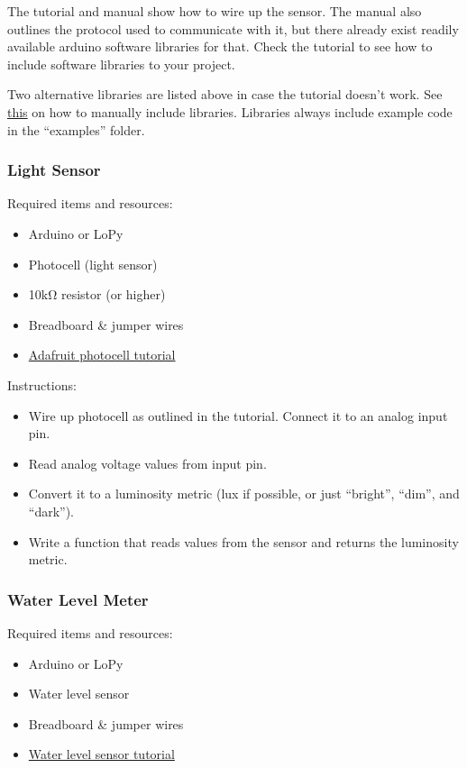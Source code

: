 \documentclass[a4paper]{article}
\begin{document}
The tutorial and manual show how to wire up the sensor.
The manual also outlines the protocol used to communicate with it,
but there already exist readily available arduino software libraries for that.
Check the tutorial to see how to include software libraries to your project.

Two alternative libraries are listed above in case the tutorial doesn't work.
See \href{https://www.arduino.cc/en/Guide/Libraries#toc5}{this} on how to manually include libraries.
Libraries always include example code in the ``examples'' folder.


\subsubsection{Light Sensor}

Required items and resources:
\begin{itemize}
 \item Arduino or LoPy
 \item Photocell (light sensor)
 \item 10k\si{\ohm} resistor (or higher)
 \item Breadboard \& jumper wires
 \item \href{https://learn.adafruit.com/photocells/using-a-photocell}{Adafruit photocell tutorial}
\end{itemize}

Instructions:
\begin{itemize}
 \item Wire up photocell as outlined in the tutorial. Connect it to an analog input pin.
 \item Read analog voltage values from input pin.
 \item Convert it to a luminosity metric (lux if possible, or just ``bright'', ``dim'', and ``dark'').
 \item Write a function that reads values from the sensor and returns the luminosity metric.
\end{itemize}


\subsubsection{Water Level Meter}

Required items and resources:
\begin{itemize}
 \item Arduino or LoPy
 \item Water level sensor
 \item Breadboard \& jumper wires
 \item \href{http://scidle.com/how-to-use-a-water-level-sensor-module-with-arduino/}{Water level sensor tutorial}
\end{itemize}
\end{document}

